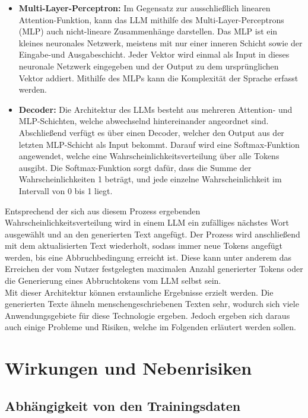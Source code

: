 \documentclass[../main.tex]{subfiles}
\begin{document}
\begin{itemize}
\item \textbf{Multi-Layer-Perceptron:} Im Gegensatz zur ausschließlich linearen Attention-Funktion, kann das LLM mithilfe des Multi-Layer-Perceptrons (MLP) auch nicht-lineare Zusammenhänge darstellen. Das MLP ist ein kleines neuronales Netzwerk, meistens mit nur einer inneren Schicht sowie der Eingabe-und Ausgabeschicht. Jeder Vektor wird einmal als Input in dieses neuronale Netzwerk eingegeben und der Output zu dem ursprünglichen Vektor addiert. Mithilfe des MLPs kann die Komplexität der Sprache erfasst werden.

\item \textbf{Decoder:} Die Architektur des LLMs besteht aus mehreren Attention- und MLP-Schichten, welche abwechselnd hintereinander angeordnet sind. Abschließend verfügt es über einen Decoder, welcher den Output aus der letzten MLP-Schicht als Input bekommt. Darauf wird eine Softmax-Funktion angewendet, welche eine Wahrscheinlichkeitsverteilung über alle Tokens ausgibt. Die Softmax-Funktion sorgt dafür, dass die Summe der Wahrscheinlichkeiten 1 beträgt, und jede einzelne Wahrscheinlichkeit im Intervall von 0 bis 1 liegt.\cite{architecture} 
\end{itemize}


Entsprechend der sich aus diesem Prozess ergebenden Wahrscheinlichkeitsverteilung wird in einem LLM ein zufälliges nächstes Wort ausgewählt und an den generierten Text angefügt. 
Der Prozess wird anschließend mit dem aktualisierten Text wiederholt, sodass immer neue Tokens angefügt werden, bis eine Abbruchbedingung erreicht ist. Diese kann unter anderem das 
Erreichen der vom Nutzer festgelegten maximalen Anzahl generierter Tokens oder die Generierung eines Abbruchtokens vom LLM selbst sein.\cite{architecture}\\

Mit dieser Architektur können erstaunliche Ergebnisse erzielt werden. Die generierten Texte ähneln menschengeschriebenen Texten sehr, wodurch sich viele Anwendungsgebiete für diese Technologie ergeben. Jedoch ergeben sich daraus auch einige Probleme und Risiken, welche im Folgenden erläutert werden sollen. 

\section{Wirkungen und Nebenrisiken}

\subsection{Abhängigkeit von den Trainingsdaten}
\end{document}

